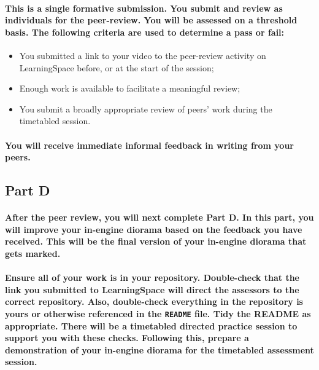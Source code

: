 \documentclass{../../fal_assignment}
\begin{document}
\paragraph{This is a \textbf{single formative submission}. You submit and review as \textbf{individuals} for the peer-review. You will be assessed on a \textbf{threshold} basis. The following criteria are used to determine a pass or fail:}

\begin{itemize}
	\item You submitted a link to your video to the peer-review activity on LearningSpace before, or at the start of the session;
	\item Enough work is available to facilitate a meaningful review;
	\item You submit a broadly appropriate review of peers' work during the timetabled session.
\end{itemize}

\paragraph{You will receive immediate \textbf{informal feedback} in writing from your \textbf{peers}.}

\subsection*{Part D}

\paragraph{After the peer review, you will next complete Part D. In this part, you will improve your in-engine diorama based on the feedback you have received. This will be the final version of your in-engine diorama that gets marked.}

\paragraph{Ensure all of your work is in your repository. Double-check that the link you submitted to LearningSpace will direct the assessors to the correct repository. Also, double-check everything in the repository is yours or otherwise referenced in the \texttt{README} file. Tidy the README as appropriate. There will be a timetabled directed practice session to support you with these checks. Following this, prepare a demonstration of your in-engine diorama for the timetabled assessment session.}
\end{document}
